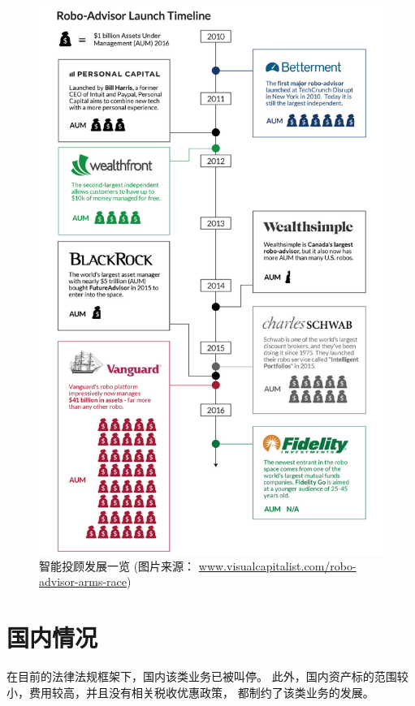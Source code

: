 \documentclass[a4paper, 11pt, UTF8]{report}
\begin{document}
\begin{figure}[htbp!]
        \centering
        \includegraphics[height=0.9\textheight]{advisor}
        \caption{智能投顾发展一览\newline
                (图片来源：
                \underline{www.visualcapitalist.com/robo-advisor-arms-race})}
        \label{fig:adviosr}
\end{figure}

\section{国内情况}

在目前的法律法规框架下，国内该类业务已被叫停。
此外，国内资产标的范围较小，费用较高，并且没有相关税收优惠政策，
都制约了该类业务的发展。
\end{document}
